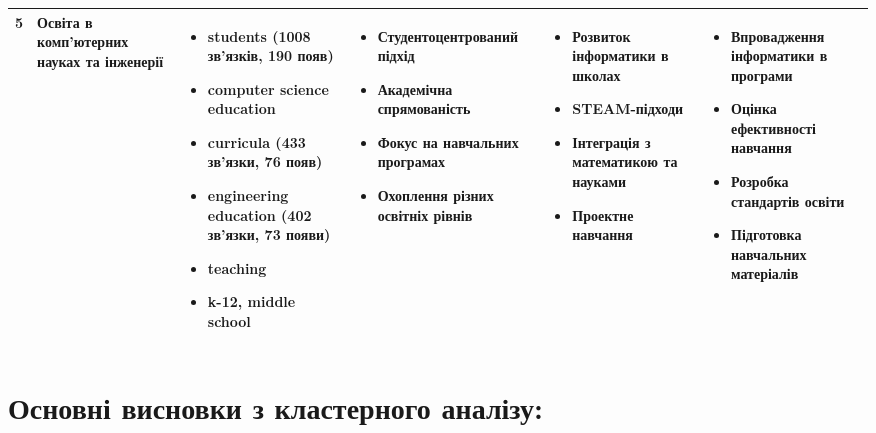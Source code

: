 \documentclass[12pt,a4paper,landscape]{article}
\begin{document}
\begin{longtable}{|p{1cm}|p{3.5cm}|p{5cm}|p{4cm}|p{4cm}|p{5cm}|}
\cellcolor{violet!20}5 & 
\textbf{Освіта в комп'ютерних науках та інженерії} & 
\begin{itemize}
    \item students (1008 зв'язків, 190 появ)
    \item computer science education
    \item curricula (433 зв'язки, 76 появ)
    \item engineering education (402 зв'язки, 73 появи)
    \item teaching
    \item k-12, middle school
\end{itemize} & 
\begin{itemize}
    \item Студентоцентрований підхід
    \item Академічна спрямованість
    \item Фокус на навчальних програмах
    \item Охоплення різних освітніх рівнів
\end{itemize} & 
\begin{itemize}
    \item Розвиток інформатики в школах
    \item STEAM-підходи
    \item Інтеграція з математикою та науками
    \item Проектне навчання
\end{itemize} & 
\begin{itemize}
    \item Впровадження інформатики в програми
    \item Оцінка ефективності навчання
    \item Розробка стандартів освіти
    \item Підготовка навчальних матеріалів
\end{itemize} \\
\hline

\end{longtable}

\vspace{1cm}

\section*{Основні висновки з кластерного аналізу:}
\end{document}
